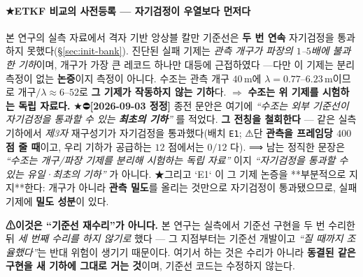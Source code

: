 \documentclass[11pt]{report}
\numberwithin{equation}{chapter}
\numberwithin{figure}{chapter}
\numberwithin{table}{chapter}
\begin{document}
\paragraph{★ETKF 비교의 사전등록 --- 자기검정이 우열보다 먼저다}
본 연구의 실측 자료에서 격자 기반 앙상블 칼만 기준선은 \textbf{두 번 연속} 자기검정을
통과하지 못했다(\S\ref{sec:init-bank}). 진단된 실패 기제는 \emph{관측 개구가 파장의
$1$--$5$배에 불과한 기하}이며, 개구가 가장 큰 레코드 하나만 대등에 근접하였다
---다만 이 기제는 분리 측정이 없는 \textbf{논증}이지 측정이 아니다.
수조는 관측 개구 $40$\,m에 $\lambda = 0.77$--$6.23$\,m이므로 개구$/\lambda \approx 6$--$52$로
\textbf{그 기제가 작동하지 않는 기하}다.
$\Rightarrow$ \textbf{수조는 위 기제를 시험하는 독립 자료다.}
★⛔\textbf{[2026-09-03 정정]} 종전 문안은 여기에 \emph{``수조는 외부 기준선이 자기검정을
통과할 수 있는 \textbf{최초의 기하}''} 를 적었다. \textbf{그 전칭을 철회한다} ---
같은 실측 기하에서 \emph{제3자} 재구성기가 자기검정을 통과했다(배치 \texttt{E1};
⚠단 \textbf{관측을 프레임당 $400$ 점 줄 때}이고, 우리 기하가 공급하는 $12$ 점에서는
$0/12$ 다). ⟹ 남는 정직한 문장은 \emph{``수조는 개구/파장 기제를 분리해 시험하는 독립
자료''} 이지 \emph{``자기검정을 통과할 수 있는 유일·최초의 기하''} 가 아니다.
★그리고 `E1` 이 그 기제 논증을 **부분적으로 지지**한다: 개구가 아니라 \textbf{관측 밀도}를
올리는 것만으로 자기검정이 통과됐으므로, 실패 기제에 \textbf{밀도 성분}이 있다.

\textbf{⚠이것은 ``기준선 재수리''가 아니다.} 본 연구는 실측에서 기준선 구현을 두 번
수리한 뒤 \emph{세 번째 수리를 하지 않기로} 했다 --- 그 지점부터는 기준선 개발이고
\emph{``질 때까지 조율했다''}는 반대 위험이 생기기 때문이다. 여기서 하는 것은 수리가 아니라
\textbf{동결된 같은 구현을 새 기하에 그대로 거는 것}이며, 기준선 코드는 수정하지 않는다.
\end{document}
